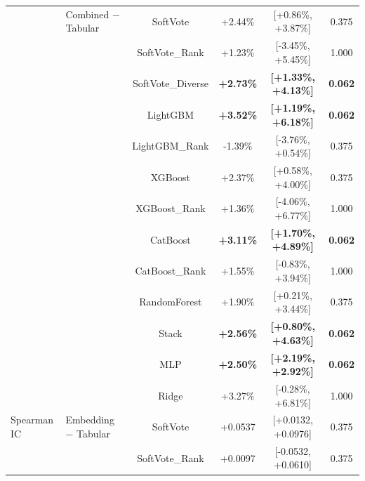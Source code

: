 \documentclass[10pt,journal,compsoc]{IEEEtran}
\begin{document}
\begin{table}[tbp]
\begin{tabular}{llcccc}
               & Combined $-$ Tabular     & SoftVote           & +2.44\%                & [+0.86\%, +3.87\%]               & 0.375      \\
               &                          & SoftVote\_Rank     & +1.23\%                & [-3.45\%, +5.45\%]               & 1.000      \\
               &                          & SoftVote\_Diverse  & \textbf{+2.73\%}       & \textbf{[+1.33\%, +4.13\%]}      & \textbf{0.062} \\
               &                          & LightGBM           & \textbf{+3.52\%}       & \textbf{[+1.19\%, +6.18\%]}      & \textbf{0.062} \\
               &                          & LightGBM\_Rank     & -1.39\%                & [-3.76\%, +0.54\%]               & 0.375      \\
               &                          & XGBoost            & +2.37\%                & [+0.58\%, +4.00\%]               & 0.375      \\
               &                          & XGBoost\_Rank      & +1.36\%                & [-4.06\%, +6.77\%]               & 1.000      \\
               &                          & CatBoost           & \textbf{+3.11\%}       & \textbf{[+1.70\%, +4.89\%]}      & \textbf{0.062} \\
               &                          & CatBoost\_Rank     & +1.55\%                & [-0.83\%, +3.94\%]               & 1.000      \\
               &                          & RandomForest       & +1.90\%                & [+0.21\%, +3.44\%]               & 0.375      \\
               &                          & Stack              & \textbf{+2.56\%}       & \textbf{[+0.80\%, +4.63\%]}      & \textbf{0.062} \\
               &                          & MLP                & \textbf{+2.50\%}       & \textbf{[+2.19\%, +2.92\%]}      & \textbf{0.062} \\
               &                          & Ridge              & +3.27\%                & [-0.28\%, +6.81\%]               & 1.000      \\
Spearman IC    & Embedding $-$ Tabular    & SoftVote           & +0.0537                & [+0.0132, +0.0976]               & 0.375      \\
               &                          & SoftVote\_Rank     & +0.0097                & [-0.0532, +0.0610]               & 0.375      \\

\end{tabular}
\end{table}
\end{document}
